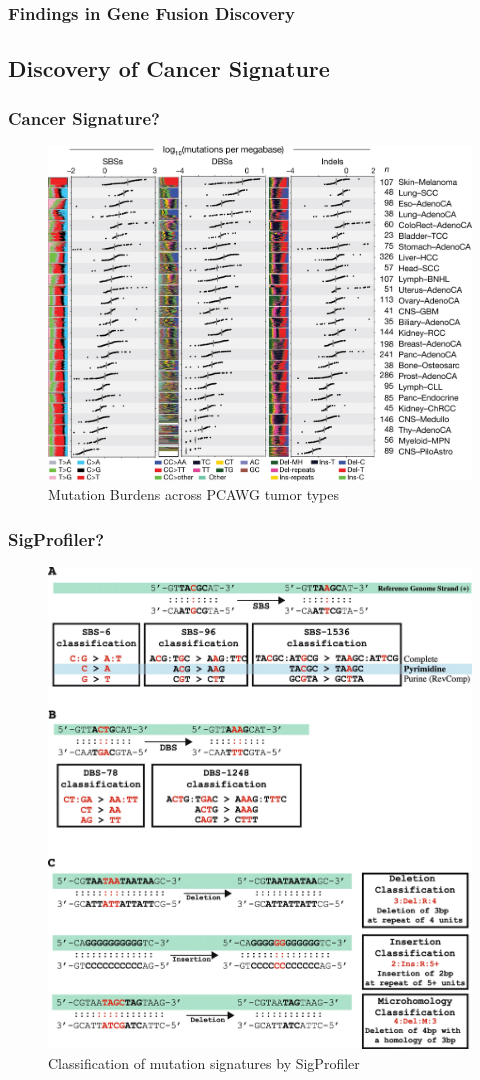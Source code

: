 \documentclass{beamer}
\begin{document}
    \begin{frame}
        \frametitle{Findings in Gene Fusion Discovery}
    \end{frame}

    \subsection{Discovery of Cancer Signature}
    \begin{frame}
        \frametitle{Cancer Signature?}

        \begin{figure}
            \includegraphics[width=0.6 \linewidth]{figures/LungCancer/signatures.jpg}
            \caption{Mutation Burdens across PCAWG tumor types \protect\cite{signature1}}
        \end{figure}
    \end{frame}

    \begin{frame}
        \frametitle{SigProfiler?}

        \begin{figure}
            \includegraphics[width=0.4 \linewidth]{figures/Workflow/SigProfiler.jpg}
            \caption{Classification of mutation signatures by SigProfiler \protect\cite{SigProfiler1, SigProfiler2, SigProfiler3, SigProfiler4}}
        \end{figure}
    \end{frame}
\end{document}
